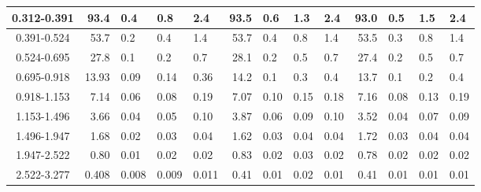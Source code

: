 \begin{table}[!htbp]
{\begin{tabular}{ | c | r@{$\pm$}l@{$\pm$}l@{$\pm$}l | r@{$\pm$}l@{$\pm$}l@{$\pm$}l | r@{$\pm$}l@{$\pm$}l@{$\pm$}l |}
0.312-0.391 & 93.4&0.4&0.8&2.4 & 93.5&0.6&1.3&2.4 & 93.0&0.5&1.5&2.4 \\ \hline
0.391-0.524 & 53.7&0.2&0.4&1.4 & 53.7&0.4&0.8&1.4 & 53.5&0.3&0.8&1.4 \\ \hline
0.524-0.695 & 27.8&0.1&0.2&0.7 & 28.1&0.2&0.5&0.7 & 27.4&0.2&0.5&0.7 \\ \hline
0.695-0.918 & 13.93&0.09&0.14&0.36 & 14.2&0.1&0.3&0.4 & 13.7&0.1&0.2&0.4 \\ \hline
0.918-1.153 & 7.14&0.06&0.08&0.19 & 7.07&0.10&0.15&0.18 & 7.16&0.08&0.13&0.19 \\ \hline
1.153-1.496 & 3.66&0.04&0.05&0.10 & 3.87&0.06&0.09&0.10 & 3.52&0.04&0.07&0.09 \\ \hline
1.496-1.947 & 1.68&0.02&0.03&0.04 & 1.62&0.03&0.04&0.04 & 1.72&0.03&0.04&0.04 \\ \hline
1.947-2.522 & 0.80&0.01&0.02&0.02 & 0.83&0.02&0.03&0.02 & 0.78&0.02&0.02&0.02 \\ \hline
2.522-3.277 & 0.408&0.008&0.009&0.011 & 0.41&0.01&0.02&0.01 & 0.41&0.01&0.01&0.01 \\ \hline
\end{tabular}}
\end{table}
\clearpage
